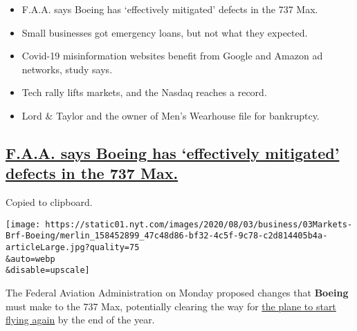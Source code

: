 \begin{itemize}
\item
  \protect\hyperlink{faa-says-boeing-has-effectively-mitigated-defects-in-the-737-max}{}

  F.A.A. says Boeing has `effectively mitigated' defects in the 737 Max.
\item
  \protect\hyperlink{small-businesses-got-emergency-loans-but-not-what-they-expected}{}

  Small businesses got emergency loans, but not what they expected.
\item
  \protect\hyperlink{covid-19-misinformation-websites-benefit-from-google-and-amazon-ad-networks-study-says}{}

  Covid-19 misinformation websites benefit from Google and Amazon ad
  networks, study says.
\item
  \protect\hyperlink{tech-rally-lifts-markets-and-the-nasdaq-reaches-a-record}{}

  Tech rally lifts markets, and the Nasdaq reaches a record.
\item
  \protect\hyperlink{lord-taylor-and-the-owner-of-mens-wearhouse-file-for-bankruptcy}{}

  Lord \& Taylor and the owner of Men's Wearhouse file for bankruptcy.
\end{itemize}

\hypertarget{faa-says-boeing-has-effectively-mitigated-defects-in-the-737-max}{%
\subsection{\texorpdfstring{\protect\hyperlink{faa-says-boeing-has-effectively-mitigated-defects-in-the-737-max}{F.A.A.
says Boeing has `effectively mitigated' defects in the 737
Max.}}{F.A.A. says Boeing has `effectively mitigated' defects in the 737 Max.}}\label{faa-says-boeing-has-effectively-mitigated-defects-in-the-737-max}}

Copied to clipboard.

\texttt{[image: https://static01.nyt.com/images/2020/08/03/business/03Markets-Brf-Boeing/merlin\_158452899\_47c48d86-bf32-4c5f-9c78-c2d814405b4a-articleLarge.jpg?quality=75\\\&auto=webp\\\&disable=upscale]}

The Federal Aviation Administration on Monday proposed changes that
\textbf{Boeing} must make to the 737 Max, potentially clearing the way
for
\href{https://www.nytimes.com/2020/07/15/business/boeing-737-max-return.html}{the
plane to start flying again} by the end of the year.


